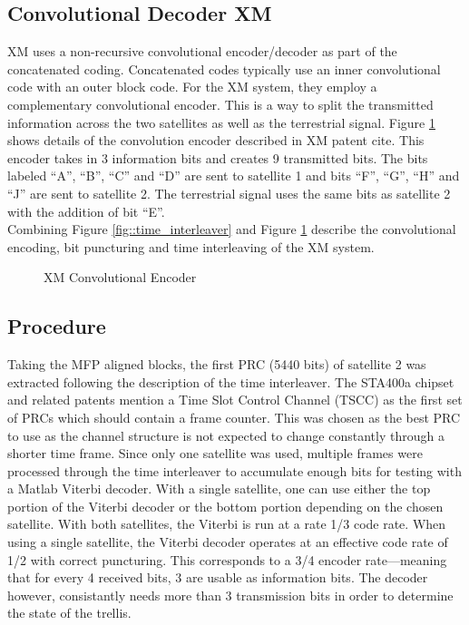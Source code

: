 \documentclass[conference,onecolumn]{IEEEtran}
\begin{document}
\subsection{Convolutional Decoder XM}
XM uses a non-recursive convolutional encoder/decoder as part of the concatenated coding.  Concatenated codes typically use an inner convolutional code with an outer block code.  For the XM system, they employ a complementary convolutional encoder.  This is a way to split the transmitted information across the two satellites as well as the terrestrial signal.  Figure \ref{fig::Viterbi} shows details of the convolution encoder described in XM patent {cite}.  This encoder takes in 3 information bits and creates 9 transmitted bits.  The bits labeled ``A'', ``B'', ``C'' and ``D'' are sent to satellite 1 and bits ``F'', ``G'', ``H'' and ``J'' are sent to satellite 2.  The terrestrial signal uses the same bits as satellite 2 with the addition of bit ``E''.\\

Combining Figure \ref{fig::time_interleaver} and Figure \ref{fig::Viterbi} describe the convolutional encoding, bit puncturing and time interleaving of the XM system.
\begin{figure}[H]
	\centerline{}
	\caption{XM Convolutional Encoder}
	\label{fig::Viterbi}
\end{figure}
\subsection{Procedure}  Taking the MFP aligned blocks, the first PRC (5440 bits) of satellite 2 was extracted following the description of the time interleaver.  The STA400a chipset and related patents mention a Time Slot Control Channel (TSCC) as the first set of PRCs which should contain a frame counter.  This was chosen as the best PRC to use as the channel structure is not expected to change constantly through a shorter time frame.  Since only one satellite was used, multiple frames were processed through the time interleaver to accumulate enough bits for testing with a Matlab Viterbi decoder.  With a single satellite, one can use either the top portion of the Viterbi decoder or the bottom portion depending on the chosen satellite.  With both satellites, the Viterbi is run at a rate 1/3 code rate.  When using a single satellite, the Viterbi decoder operates at an effective code rate of 1/2 with correct puncturing. This corresponds to a 3/4 encoder rate—meaning that for every 4 received bits, 3 are usable as information bits.  The decoder however, consistantly needs more than 3 transmission bits in order to determine the state of the trellis.
\end{document}
